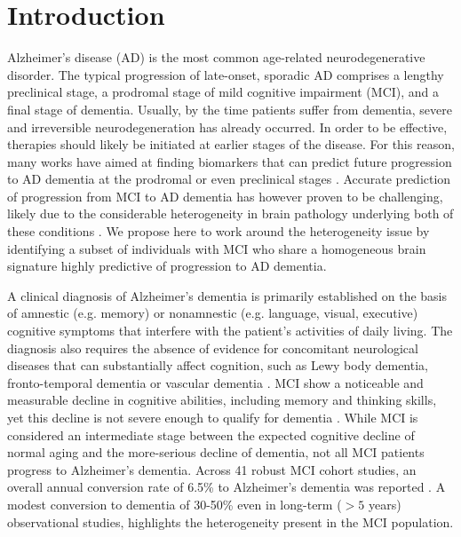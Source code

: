 \documentclass[authoryear]{elsarticle}
\begin{document}
\section{Introduction}
Alzheimer's disease (AD) is the most common age-related neurodegenerative disorder. The typical progression of late-onset, sporadic AD comprises a lengthy preclinical stage, a prodromal stage of mild cognitive impairment (MCI), and a final stage of dementia. Usually, by the time patients suffer from dementia, severe and irreversible neurodegeneration has already occurred. In order to be effective, therapies should likely be initiated at earlier stages of the disease. For this reason, many works have aimed at finding biomarkers that can predict future progression to AD dementia at the prodromal or even preclinical stages \citep{Rathore2017review,Orban2017c}. Accurate prediction of progression from MCI to AD dementia has however proven to be challenging, likely due to the considerable heterogeneity in brain pathology underlying both of these conditions \citep{Rathore2017review}. We propose here to work around the heterogeneity issue by identifying a subset of individuals with MCI who share a homogeneous brain signature highly predictive of progression to AD dementia.

A clinical diagnosis of Alzheimer's dementia is primarily established on the basis of amnestic (e.g. memory) or nonamnestic (e.g. language, visual, executive) cognitive symptoms that interfere with the patient's activities of daily living. The diagnosis also requires the absence of evidence for concomitant neurological diseases that can substantially affect cognition, such as Lewy body dementia, fronto-temporal dementia or vascular dementia \citep{Mckhann2011}. MCI show a noticeable and measurable decline in cognitive abilities, including memory and thinking skills, yet this decline is not severe enough to qualify for dementia \citep{Petersen2014}. While MCI is considered an intermediate stage between the expected cognitive decline of normal aging and the more-serious decline of dementia, not all MCI patients progress to Alzheimer's dementia. Across 41 robust MCI cohort studies, an overall annual conversion rate of 6.5\% to Alzheimer's dementia was reported \citep{Ward2013}. A modest conversion to dementia of 30-50\% even in long-term ($>5$ years) observational studies, highlights the heterogeneity present in the MCI population.
\end{document}
